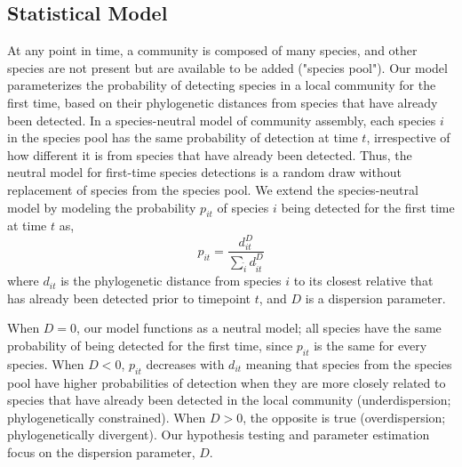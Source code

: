 \documentclass{article}
\begin{document}
\subsection{Statistical Model} \label{sec:statisticalModel}
At any point in time, a community is composed of many species, and other species are not present but are available to be added ("species pool"). Our model parameterizes the probability of detecting species in a local community for the first time, based on their phylogenetic distances from species that have already been detected. In a species-neutral model of community assembly, each species \(i\) in the species pool has the same probability of detection at time \(t\), irrespective of how different it is from species that have already been detected. Thus, the neutral model for first-time species detections is a random draw without replacement of species from the species pool. We extend the species-neutral model by modeling the probability \(p_{it}\) of species \(i\) being detected for the first time at time \(t\) as,
\begin{equation}
	\label{sec:equation1}
	p_{it} = \frac {d_{it}^D} { \sum\limits_{\hat{i}} d_{\hat{i}t}^D } 
\end{equation}
where \(d_{it}\) is the phylogenetic distance from species \(i\) to its closest relative that has already been detected prior to timepoint \(t\), and \(D\) is a dispersion parameter.
\par
When \(D = 0\), our model functions as a neutral model; all species have the same probability of being detected for the first time, since \(p_{it}\) is the same for every species. When \(D < 0\), \(p_{it}\) decreases with \(d_{it}\) meaning that species from the species pool have higher probabilities of detection when they are more closely related to species that have already been detected in the local community (underdispersion; phylogenetically constrained). When \(D>0\), the opposite is true (overdispersion; phylogenetically divergent). Our hypothesis testing and parameter estimation focus on the dispersion parameter, \(D\).
\end{document}
